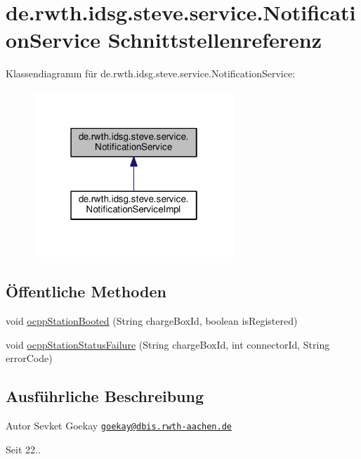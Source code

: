\hypertarget{interfacede_1_1rwth_1_1idsg_1_1steve_1_1service_1_1_notification_service}{\section{de.\+rwth.\+idsg.\+steve.\+service.\+Notification\+Service Schnittstellenreferenz}
\label{interfacede_1_1rwth_1_1idsg_1_1steve_1_1service_1_1_notification_service}
}


Klassendiagramm für de.\+rwth.\+idsg.\+steve.\+service.\+Notification\+Service\+:\nopagebreak
\begin{figure}[H]
\begin{center}
\leavevmode
\includegraphics[width=214pt]{interfacede_1_1rwth_1_1idsg_1_1steve_1_1service_1_1_notification_service__inherit__graph}
\end{center}
\end{figure}
\subsection*{Öffentliche Methoden}
\begin{DoxyCompactItemize}
\item 
void \hyperlink{interfacede_1_1rwth_1_1idsg_1_1steve_1_1service_1_1_notification_service_a9fea2e0d6d992511a4d5dac8e5b36791}{ocpp\+Station\+Booted} (String charge\+Box\+Id, boolean is\+Registered)
\item 
void \hyperlink{interfacede_1_1rwth_1_1idsg_1_1steve_1_1service_1_1_notification_service_aca4353bbbda5a56c48669d68975c19ab}{ocpp\+Station\+Status\+Failure} (String charge\+Box\+Id, int connector\+Id, String error\+Code)
\end{DoxyCompactItemize}


\subsection{Ausführliche Beschreibung}
\begin{DoxyAuthor}{Autor}
Sevket Goekay \href{mailto:goekay@dbis.rwth-aachen.de}{\tt goekay@dbis.\+rwth-\/aachen.\+de} 
\end{DoxyAuthor}
\begin{DoxySince}{Seit}
22.. 
\end{DoxySince}


